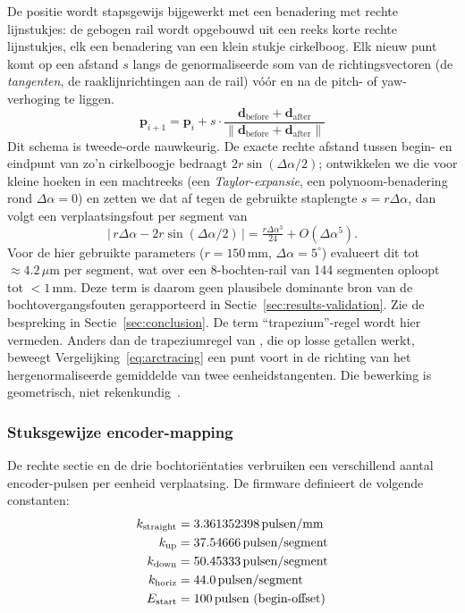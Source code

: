 \documentclass[10pt, a4paper, twocolumn]{article}
\begin{document}
De positie wordt stapsgewijs bijgewerkt met een benadering met rechte
lijnstukjes: de gebogen rail wordt opgebouwd uit een reeks korte rechte
lijnstukjes, elk een benadering van een klein stukje cirkelboog. Elk nieuw punt komt op een
afstand $s$ langs de genormaliseerde som van de richtingsvectoren (de
\emph{tangenten}, de raaklijnrichtingen aan de rail) vóór en na de pitch- of
yaw-verhoging te liggen.
\begin{equation}
\label{eq:arctracing}
\mathbf{p}_{i+1} = \mathbf{p}_i + s \cdot \frac{\mathbf{d}_{\text{before}} + \mathbf{d}_{\text{after}}}{\|\mathbf{d}_{\text{before}} + \mathbf{d}_{\text{after}}\|}
\end{equation}
Dit schema is tweede-orde nauwkeurig. De exacte rechte afstand tussen begin- en
eindpunt van zo'n cirkelboogje bedraagt $2r\sin(\Delta\alpha/2)$;
ontwikkelen we die voor kleine hoeken in een machtreeks (een
\emph{Taylor-expansie}, een polynoom-benadering rond $\Delta\alpha = 0$) en
zetten we dat af tegen de gebruikte staplengte $s = r\Delta\alpha$, dan volgt een
verplaatsingsfout per segment van
\begin{equation}
\label{eq:arctracing-error}
|\,r\Delta\alpha - 2r\sin(\Delta\alpha/2)\,| = \tfrac{r\Delta\alpha^3}{24} + O(\Delta\alpha^5).
\end{equation}
Voor de hier gebruikte parameters ($r=150$\,mm, $\Delta\alpha=5^\circ$)
evalueert dit tot $\approx 4.2\,\mu$m per segment, wat over een
8-bochten-rail van 144 segmenten oploopt tot $<1$\,mm. Deze term is daarom
geen plausibele dominante bron van de bochtovergangsfouten gerapporteerd in
Sectie~\ref{sec:results-validation}. Zie de bespreking in
Sectie~\ref{sec:conclusion}. De term ``trapezium''-regel wordt hier vermeden. Anders dan de
trapeziumregel van \cite[\S3.6]{strang2016calculus}, die op losse getallen werkt, beweegt
Vergelijking~\ref{eq:arctracing} een punt voort in de richting van het
hergenormaliseerde gemiddelde van twee eenheidstangenten. Die bewerking is
geometrisch, niet rekenkundig~\cite{shoemake1985quaternion,diebel2006attitude}.

\subsubsection{Stuksgewijze encoder-mapping}
De rechte sectie en de drie bochtoriëntaties verbruiken een verschillend aantal
encoder-pulsen per eenheid verplaatsing. De firmware definieert de volgende
constanten:
\begin{align}
\label{eq:pulsecosts}
k_{\text{straight}} &= 3.361352398 \text{\,pulsen/mm} \nonumber\\
k_{\text{up}} &= 37.54666 \text{\,pulsen/segment} \nonumber\\
k_{\text{down}} &= 50.45333 \text{\,pulsen/segment} \\
k_{\text{horiz}} &= 44.0 \text{\,pulsen/segment} \nonumber\\
E_{\text{start}} &= 100 \text{\,pulsen (begin-offset)} \nonumber
\end{align}
\end{document}
